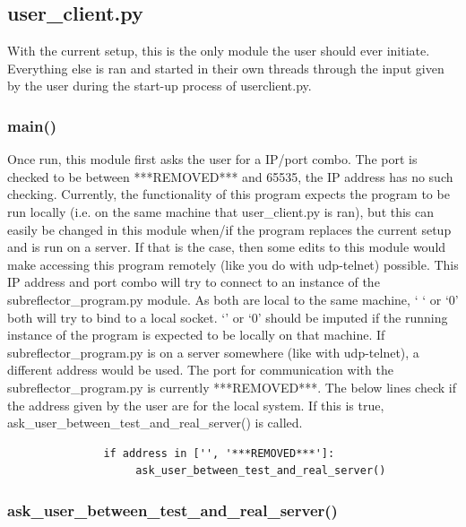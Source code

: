 \documentclass{article}
\begin{document}
 


\subsection{user\_client.py}
 With the current setup, this is the only module the user should ever initiate. Everything else is ran and started in their own threads through the input given by the user during the start-up process of user\-client.py. 
 
 \subsubsection*{main()}
 
 Once run, this module first asks the user for a IP/port combo. The port is checked to be between ***REMOVED*** and 65535, the IP address has no such checking. Currently, the functionality of this program expects the program to be run locally (i.e. on the same machine that user\_client.py is ran), but this can easily be changed in this module when/if the program replaces the current setup and is run on a server. If that is the case, then some edits to this module would make accessing this program remotely (like you do with udp-telnet) possible. This IP address and port combo will try to connect to an instance of the subreflector\_program.py module. As both are local to the same machine, ` ` or `0' both will try to bind to a local socket. `' or `0' should be imputed if the running instance of the program is expected to be locally on that machine. If subreflector\_program.py is on a server somewhere (like with udp-telnet), a different address would be used. The port for communication with the subreflector\_program.py is currently ***REMOVED***. The below lines check if the address given by the user are for the local system. If this is true, ask\_user\_between\_test\_and\_real\_server() is called. 

    \begin{lstlisting}
               if address in ['', '***REMOVED***']:
                    ask_user_between_test_and_real_server()
    \end{lstlisting}

\subsubsection*{ask\_user\_between\_test\_and\_real\_server()}
\end{document}
